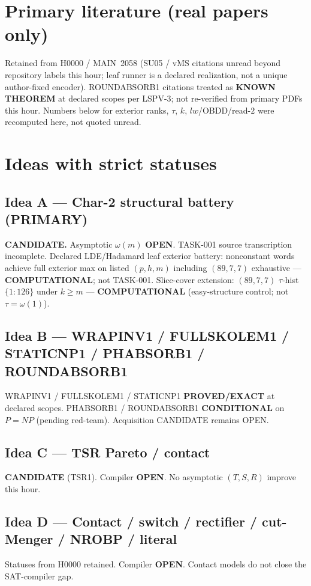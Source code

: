 \documentclass[11pt]{article}
\begin{document}
\section*{Primary literature (real papers only)}
Retained from H0000 / MAIN~2058 (SU05 / vMS citations unread beyond repository labels this hour;
leaf runner is a declared realization, not a unique author-fixed encoder).
ROUNDABSORB1 citations treated as \textbf{KNOWN THEOREM} at declared scopes per LSPV-3;
not re-verified from primary PDFs this hour.
Numbers below for exterior ranks, $\tau$, $k$, $lw$/OBDD/read-$2$
were recomputed here, not quoted unread.

\section*{Ideas with strict statuses}
\subsection*{Idea A --- Char-2 structural battery (PRIMARY)}
\textbf{CANDIDATE.} Asymptotic $\omega(m)$ \textbf{OPEN}. TASK-001 source transcription incomplete.
Declared LDE/Hadamard leaf exterior battery: nonconstant words achieve full exterior max on
listed $(p,h,m)$ including $(89,7,7)$ exhaustive --- \textbf{COMPUTATIONAL}; not TASK-001.
Slice-cover extension: $(89,7,7)$ $\tau$-hist $\{1{:}126\}$ under $k{\ge}m$ ---
\textbf{COMPUTATIONAL} (easy-structure control; not $\tau=\omega(1)$).

\subsection*{Idea B --- WRAPINV1 / FULLSKOLEM1 / STATICNP1 / PHABSORB1 / ROUNDABSORB1}
WRAPINV1 / FULLSKOLEM1 / STATICNP1 \textbf{PROVED/EXACT} at declared scopes.
PHABSORB1 / ROUNDABSORB1 \textbf{CONDITIONAL} on $P=NP$ (pending red-team). Acquisition CANDIDATE remains OPEN.

\subsection*{Idea C --- TSR Pareto / contact}
\textbf{CANDIDATE} (TSR1). Compiler \textbf{OPEN}. No asymptotic $(T,S,R)$ improve this hour.

\subsection*{Idea D --- Contact / switch / rectifier / cut-Menger / NROBP / literal}
Statuses from H0000 retained. Compiler \textbf{OPEN}. Contact models do not close the SAT-compiler gap.
\end{document}
